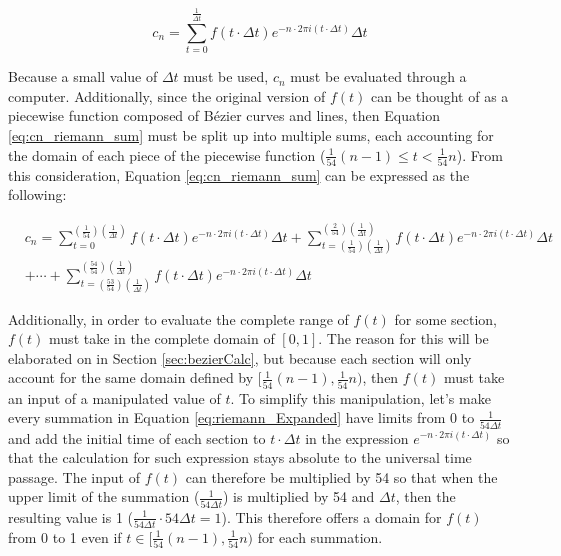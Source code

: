 \documentclass[letterpaper, 12pt]{article}
\begin{document}
\begin{equation}
    c_n = \sum_{t = 0}^{\frac{1}{\Delta t}} f(t \cdot \Delta t) e^{-n \cdot 2\pi i(t \cdot \Delta t)} \Delta t
    \label{eq:cn_riemann_sum}
\end{equation}

Because a small value of \(\Delta t\) must be used, \(c_n\) must
be evaluated through a computer. Additionally, since the original
version of \(f(t)\) can be thought of as a piecewise function composed
of Bézier curves and lines, then Equation \ref*{eq:cn_riemann_sum}
must be split up into multiple sums, each accounting for the domain
of each piece of the piecewise function (\(\frac{1}{54}(n-1) \le t < \frac{1}{54}n\)).
From this consideration, Equation \ref*{eq:cn_riemann_sum} can be
expressed as the following:

\begin{equation}
    \begin{aligned} \label{eq:riemann_Expanded}
         & c_n = \sum_{t = 0}^{(\frac{1}{54})(\frac{1}{\Delta t})} f(t \cdot \Delta t) e^{-n \cdot 2\pi i(t \cdot \Delta t)} \Delta t
        + \sum_{t = (\frac{1}{54})(\frac{1}{\Delta t})}^{(\frac{2}{54})(\frac{1}{\Delta t})} f(t \cdot \Delta t) e^{-n \cdot 2\pi i(t \cdot \Delta t)} \Delta t
        \\
         & + \cdots
        + \sum_{t = (\frac{53}{54})(\frac{1}{\Delta t})}^{(\frac{54}{54})(\frac{1}{\Delta t})} f(t \cdot \Delta t) e^{-n \cdot 2\pi i(t \cdot \Delta t)} \Delta t
    \end{aligned}
\end{equation}

Additionally, in order to evaluate the complete range of \(f(t)\)
for some section, \(f(t)\) must take in the complete domain of
\([0, 1]\). The reason for this will be elaborated on in
Section \ref*{sec:bezierCalc}, but because each section will only
account for the same domain defined by \([\frac{1}{54}(n-1), \frac{1}{54}n)\),
then \(f(t)\) must take an input of a manipulated value of \(t\).
To simplify this manipulation, let's make every summation in
Equation \ref*{eq:riemann_Expanded} have limits from 0 to
\(\frac{1}{54\Delta t}\) and add the initial time of each
section to \(t \cdot \Delta t\) in the expression
\(e^{-n \cdot 2\pi i(t \cdot \Delta t)}\) so that
the calculation for such expression stays absolute to the universal
time passage. The input of \(f(t)\) can therefore be multiplied
by 54 so that when the upper limit of the summation (\(\frac{1}{54\Delta t}\))
is multiplied by 54 and \(\Delta t\), then the resulting value
is 1 (\(\frac{1}{54\Delta t} \cdot 54\Delta t = 1\)).
This therefore offers a domain for \(f(t)\) from 0 to 1 even if
\(t \in [\frac{1}{54}(n-1), \frac{1}{54}n)\) for each
summation.
\end{document}
